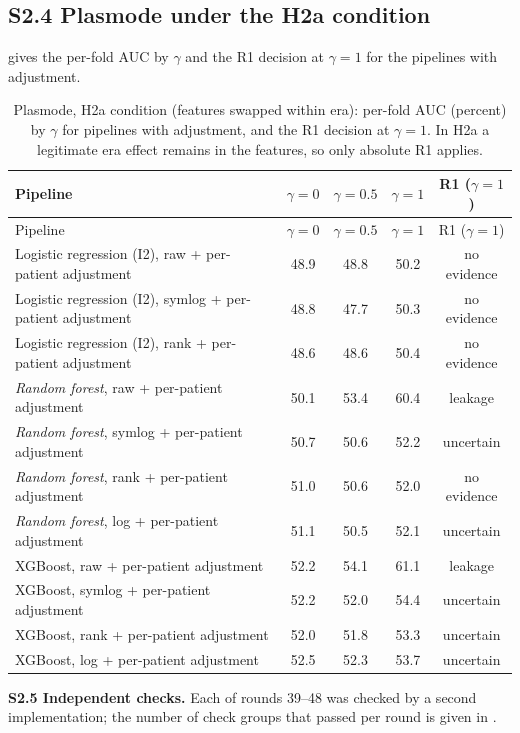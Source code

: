 \subsection*{S2.4 Plasmode under the H2a condition}
 gives the per-fold AUC by $\gamma$ and the R1 decision at $\gamma=1$ for the pipelines with adjustment.
{\scriptsize
\begin{longtable}{p{}cccc}
\caption{Plasmode, H2a condition (features swapped within era): per-fold AUC (percent) by $\gamma$ for pipelines with adjustment, and the R1 decision at $\gamma=1$. In H2a a legitimate era effect remains in the features, so only absolute R1 applies.}\label{tab:s2_h2a}\\
\toprule
Pipeline & $\gamma=0$ & $\gamma=0.5$ & $\gamma=1$ & R1 ($\gamma=1$) \\
\midrule
\endfirsthead
\toprule
Pipeline & $\gamma=0$ & $\gamma=0.5$ & $\gamma=1$ & R1 ($\gamma=1$) \\
\midrule
\endhead
\bottomrule
\endfoot
Logistic regression (I2), raw + per-patient adjustment & 48.9 & 48.8 & 50.2 & no evidence \\
Logistic regression (I2), symlog + per-patient adjustment & 48.8 & 47.7 & 50.3 & no evidence \\
Logistic regression (I2), rank + per-patient adjustment & 48.6 & 48.6 & 50.4 & no evidence \\
\textit{Random forest}, raw + per-patient adjustment & 50.1 & 53.4 & 60.4 & leakage \\
\textit{Random forest}, symlog + per-patient adjustment & 50.7 & 50.6 & 52.2 & uncertain \\
\textit{Random forest}, rank + per-patient adjustment & 51.0 & 50.6 & 52.0 & no evidence \\
\textit{Random forest}, log + per-patient adjustment & 51.1 & 50.5 & 52.1 & uncertain \\
XGBoost, raw + per-patient adjustment & 52.2 & 54.1 & 61.1 & leakage \\
XGBoost, symlog + per-patient adjustment & 52.2 & 52.0 & 54.4 & uncertain \\
XGBoost, rank + per-patient adjustment & 52.0 & 51.8 & 53.3 & uncertain \\
XGBoost, log + per-patient adjustment & 52.5 & 52.3 & 53.7 & uncertain \\
\end{longtable}
}

\textbf{S2.5 Independent checks.} Each of rounds 39--48 was checked by a second implementation; the number of check groups that passed per round is given in .

